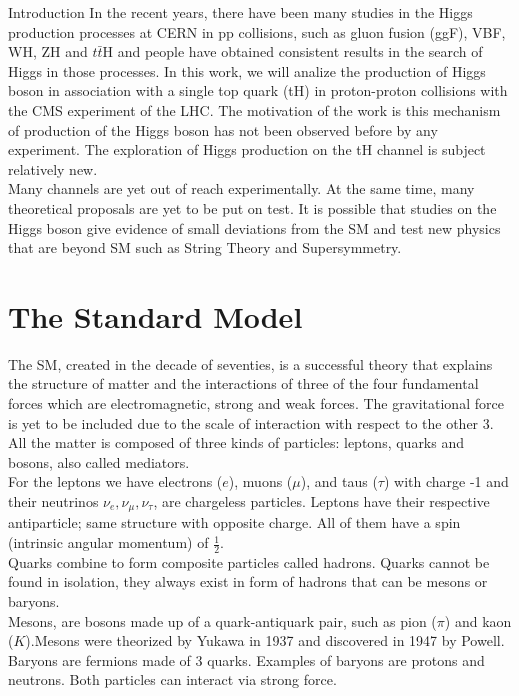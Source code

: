 \begin{chapter}{Introduction}
In the recent years, there have been many studies in the Higgs production processes at CERN in pp collisions, such as gluon fusion (ggF), VBF, WH, ZH and $t\bar{t}$H and people have obtained consistent results in the search of Higgs in those processes. 
In this work, we will analize the production of Higgs boson in association with a
single top quark (tH) in proton-proton collisions with the CMS experiment of the LHC. 
The motivation of the work is this mechanism of production of the Higgs boson has not been observed before by any experiment. The exploration of Higgs production on the tH channel is subject relatively new. %
\\
Many channels are yet out of
reach experimentally. At the same time, many theoretical
proposals are yet to be put on test. It is possible that studies on the Higgs boson give evidence of small deviations from the SM and test new physics that are beyond SM such as String Theory and Supersymmetry. \\


\section{The Standard Model} %
The SM, created in the decade of seventies, is a successful theory that explains the structure of matter and the interactions of three of the four fundamental forces which are electromagnetic, strong and weak forces. The gravitational force is yet to be included due to the scale of interaction with respect to the other 3. All the matter is composed of three kinds of particles: leptons, quarks and bosons, also called mediators.\\

For the leptons we have electrons ($e$), muons ($\mu$), and taus ($\tau$) with charge -1 and their neutrinos $\nu_e, \nu_\mu, \nu_\tau$, are chargeless particles. Leptons have their respective antiparticle; same structure with opposite charge. 
 All of them have a spin (intrinsic angular momentum) of $\frac{1}{2}$\cite{griff}.%
\\

 Quarks combine to form composite particles called hadrons. Quarks cannot be found in isolation, they always exist in form of hadrons that can be mesons or baryons. \\
Mesons, are bosons made up of a quark-antiquark pair, such as pion ($\pi$) and kaon ($K$).Mesons were theorized by Yukawa in 1937 and discovered in 1947 by Powell\cite{griff}.
Baryons are fermions made of 3 quarks. Examples of baryons are protons and neutrons. Both particles can interact via strong force.
\\


\end{chapter}
